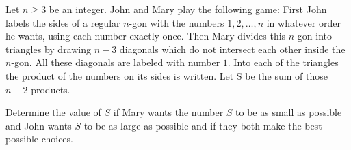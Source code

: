 Let $n \geq 3$ be an integer. John and Mary play the following game: First John labels the sides of a regular $n$-gon with the numbers $1, 2,\ldots, n$ in whatever order he wants, using each number exactly once. Then Mary divides this $n$-gon into triangles by drawing $n-3$ diagonals which do not intersect each other inside the $n$-gon. All these diagonals are labeled with number $1$. Into each of the triangles the product of the numbers on its sides is written. Let S be the sum of those $n - 2$ products.

Determine the value of $S$ if Mary wants the number $S$ to be as small as possible and John wants $S$ to be as large as possible and if they both make the best possible choices.